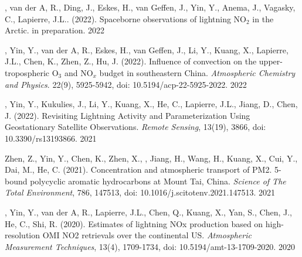 

\begin{cvpublications}

\publication
{, van der A, R., Ding, J., Eskes, H., van Geffen, J.,
Yin, Y., Anema, J., Vagasky, C., Lapierre, J.L.. (2022).
Spaceborne observations of lightning NO$_2$ in the Arctic. in preparation.} %
{2022} %

\publication
{, Yin, Y., van der A, R., Eskes, H., van Geffen, J.,
Li, Y., Kuang, X., Lapierre, J.L., Chen, K., Zhen, Z., Hu, J. (2022).
Influence of convection on the upper-tropospheric O$_3$ and NO$_x$ budget in southeastern China.
\emph{Atmospheric Chemistry and Physics}.
22(9), 5925-5942, doi: 10.5194/acp-22-5925-2022.} %
{2022} %

\publication
{, Yin, Y., Kukulies, J., Li, Y., Kuang, X.,
He, C., Lapierre, J.L., Jiang, D., Chen, J. (2022).
Revisiting Lightning Activity and Parameterization Using
Geostationary Satellite Observations.
\emph{Remote Sensing}, 13(19), 3866,
doi: 10.3390/rs13193866.} %
{2021} %

\publication
{Zhen, Z., Yin, Y., Chen, K., Zhen, X., ,
Jiang, H., Wang, H., Kuang, X., Cui, Y., Dai, M., He, C. (2021).
Concentration and atmospheric transport of PM2. 5-bound polycyclic aromatic hydrocarbons at Mount Tai, China.
\emph{Science of The Total Environment}, 786, 147513,
doi: 10.1016/j.scitotenv.2021.147513.} %
{2021} %

\publication
{, Yin, Y., van der A, R., Lapierre, J.L.,
Chen, Q., Kuang, X., Yan, S., Chen, J., He, C., Shi, R. (2020).
Estimates of lightning NOx production based on high-resolution OMI NO2 retrievals over the continental US.
\emph{Atmospheric Measurement Techniques}, 13(4), 1709-1734,
doi: 10.5194/amt-13-1709-2020.} %
{2020} %


\end{cvpublications}
